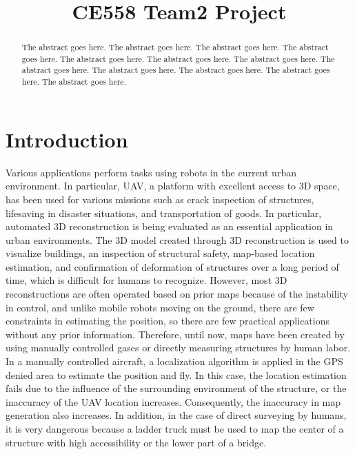\documentclass[conference,onecolumn]{IEEEtran} %
\begin{document}
%
\title{CE558 Team2 Project}


\author{
}


\maketitle


\begin{abstract}
The abstract goes here. The abstract goes here. The abstract goes here. The abstract goes here.
The abstract goes here. The abstract goes here. The abstract goes here. The abstract goes here.
The abstract goes here. The abstract goes here. The abstract goes here. The abstract goes here.
\end{abstract}


\section{Introduction}
Various applications perform tasks using robots in the current urban environment. In particular, UAV, a platform with excellent access to 3D space, has been used for various missions such as crack inspection of structures, lifesaving in disaster situations, and transportation of goods. In particular, automated 3D reconstruction is being evaluated as an essential application in urban environments. The 3D model created through 3D reconstruction is used to visualize buildings, an inspection of structural safety, map-based location estimation, and confirmation of deformation of structures over a long period of time, which is difficult for humans to recognize. However, most 3D reconstructions are often operated based on prior maps because of the instability in control, and unlike mobile robots moving on the ground, there are few constraints in estimating the position, so there are few practical applications without any prior information. Therefore, until now, maps have been created by using manually controlled gases or directly measuring structures by human labor. In a manually controlled aircraft, a localization algorithm is applied in the GPS denied area to estimate the position and fly. In this case, the location estimation fails due to the influence of the surrounding environment of the structure, or the inaccuracy of the UAV location increases. Consequently, the inaccuracy in map generation also increases. In addition, in the case of direct surveying by humans, it is very dangerous because a ladder truck must be used to map the center of a structure with high accessibility or the lower part of a bridge.
\end{document}
